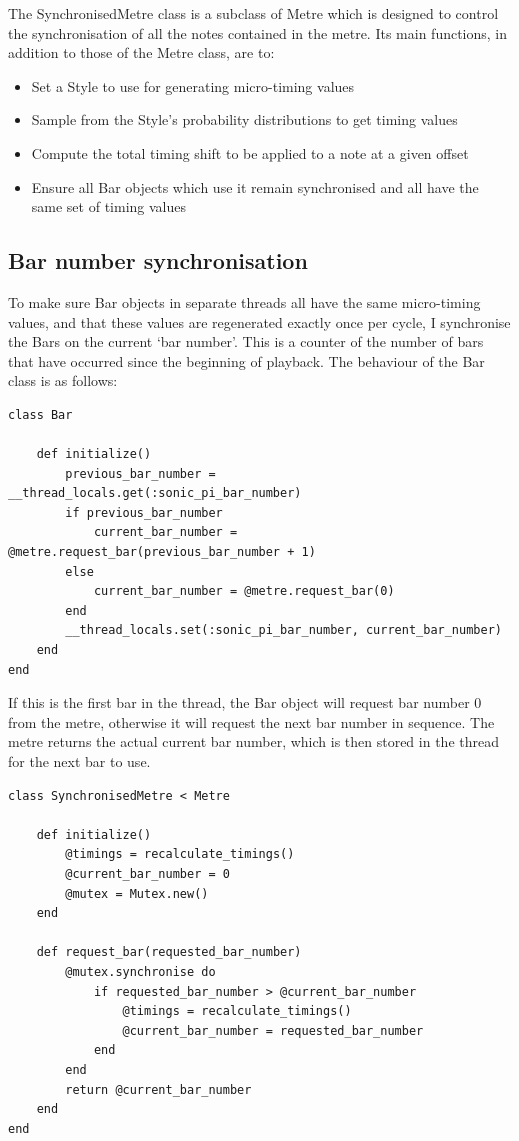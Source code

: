 \documentclass[12pt,twoside,openright]{report}
\begin{document}
The SynchronisedMetre class is a subclass of Metre which is designed to control
the synchronisation of all the notes contained in the metre. Its main functions,
in addition to those of the Metre class, are to:
\begin{itemize}
	\item Set a Style to use for generating micro-timing values
	\item Sample from the Style's probability distributions to get timing values
	\item Compute the total timing shift to be applied to a note at a given offset
	\item Ensure all Bar objects which use it remain synchronised and all have the same set of timing values
\end{itemize}


\subsection{Bar number synchronisation} \label{bar_number_synchronisation}

To make sure Bar objects in separate threads all have the same micro-timing
values, and that these values are regenerated exactly once per cycle, I
synchronise the Bars on the current `bar number'. This is a counter of the
number of bars that have occurred since the beginning of playback. The behaviour
of the Bar class is as follows:

\begin{verbatim}
class Bar

    def initialize()
        previous_bar_number = __thread_locals.get(:sonic_pi_bar_number)
        if previous_bar_number
            current_bar_number = @metre.request_bar(previous_bar_number + 1)
        else
            current_bar_number = @metre.request_bar(0)
        end
        __thread_locals.set(:sonic_pi_bar_number, current_bar_number)
    end
end
\end{verbatim}

If this is the first bar in the thread, the Bar object will request bar number 0
from the metre, otherwise it will request the next bar number in sequence. The
metre returns the actual current bar number, which is then stored in the thread
for the next bar to use.

\begin{verbatim}
class SynchronisedMetre < Metre

    def initialize()
        @timings = recalculate_timings()
        @current_bar_number = 0
        @mutex = Mutex.new()
    end

    def request_bar(requested_bar_number)
        @mutex.synchronise do
            if requested_bar_number > @current_bar_number
                @timings = recalculate_timings()
                @current_bar_number = requested_bar_number
            end
        end
        return @current_bar_number
    end
end
\end{verbatim}
\end{document}
